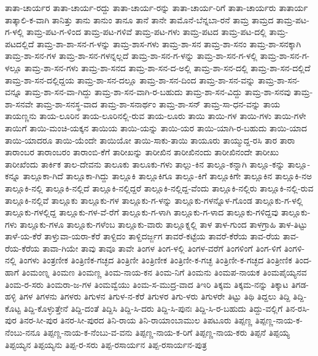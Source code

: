 ತಾತಾ-ಚಾರ್ಯರ
ತಾತಾ-ಚಾರ್ಯ-ರದ್ದು
ತಾತಾ-ಚಾರ್ಯ-ರನ್ನು
ತಾತಾ-ಚಾರ್ಯ-ರಿಗೆ
ತಾತಾ-ಚಾರ್ಯರು
ತಾತಾರ್ಯ
ತಾತ್ಕಾಲಿ-ಕ-ವಾಗಿ
ತಾನಿತ್ತು
ತಾನು
ತಾನುಂ
ತಾನೂ
ತಾನೆ
ತಾನೇ
ತಾಮೊನೆ-ಬೆನ್ನಬಾ-ರನೆ
ತಾಮ್ರ
ತಾಮ್ರದ
ತಾಮ್ರ-ಪಟ-ಗ-ಳಲ್ಲಿ
ತಾಮ್ರ-ಪಟ-ಗ-ಳಿಂದ
ತಾಮ್ರ-ಪಟ-ಗಳಿವೆ
ತಾಮ್ರ-ಪಟ-ಗಳು
ತಾಮ್ರ-ಪಟದ
ತಾಮ್ರ-ಪಟ-ದಲ್ಲಿ
ತಾಮ್ರ-ಪಟದಲ್ಲಿದೆ
ತಾಮ್ರ-ಶಾ-ಶಾ-ಸನ-ಗ-ಳನ್ನು
ತಾಮ್ರ-ಶಾಸ-ಗಳು
ತಾಮ್ರ-ಶಾ-ಸನ
ತಾಮ್ರ-ಶಾ-ಸನಂ
ತಾಮ್ರ-ಶಾ-ಸನಕ್ಕಾಗಿ
ತಾಮ್ರ-ಶಾ-ಸನ-ಗಳ
ತಾಮ್ರ-ಶಾ-ಸನ-ಗಳನ್ನಲ್ಲದೆ
ತಾಮ್ರ-ಶಾ-ಸನ-ಗ-ಳನ್ನು
ತಾಮ್ರ-ಶಾ-ಸನ-ಗ-ಳಲ್ಲಿ
ತಾಮ್ರ-ಶಾ-ಸನ-ಗ-ಳಲ್ಲೂ
ತಾಮ್ರ-ಶಾ-ಸನ-ಗಳು
ತಾಮ್ರ-ಶಾ-ಸನದ
ತಾಮ್ರ-ಶಾ-ಸನ-ದ-ಅಲ್ಲಿ
ತಾಮ್ರ-ಶಾ-ಸನ-ದಲ್ಲಿ
ತಾಮ್ರ-ಶಾ-ಸನ-ದಲ್ಲಿದೆ
ತಾಮ್ರ-ಶಾ-ಸನ-ದಲ್ಲಿದ್ದಯ
ತಾಮ್ರ-ಶಾ-ಸನ-ದಲ್ಲೂ
ತಾಮ್ರ-ಶಾ-ಸನ-ದಿಂದ
ತಾಮ್ರ-ಶಾ-ಸನ-ವನ್ನು
ತಾಮ್ರ-ಶಾ-ಸನ-ವನ್ನೂ
ತಾಮ್ರ-ಶಾ-ಸನ-ವಾ-ಗಿದ್ದು
ತಾಮ್ರ-ಶಾ-ಸನ-ವಾಗಿ-ರ-ಬಹುದು
ತಾಮ್ರ-ಶಾ-ಸನ-ವಿದ್ದು
ತಾಮ್ರ-ಶಾ-ಸನವು
ತಾಮ್ರ-ಶಾ-ಸನವೇ
ತಾಮ್ರ-ಶಾ-ಸನಸ್ಥ-ವಾದ
ತಾಮ್ರ-ಶಾ-ಸನಾರ್ಥಂ
ತಾಮ್ರ-ಶಾ-ಸನ್
ತಾಮ್ರ-ಸಾ-ಧನ-ವನ್ನು
ತಾಯ
ತಾಯಣ್ಣನು
ತಾಯ-ಲೂರಿನ
ತಾಯ-ಲೂರಿನಲ್ಲಿ-ರುವ
ತಾಯ-ಲೂರು
ತಾಯಿ
ತಾಯಿ-ಗಳ
ತಾಯಿ-ಗಳು
ತಾಯಿ-ಗಳೇ
ತಾಯಿಗೆ
ತಾಯಿ-ಮಂಚಿ-ಯಕ್ಕನ
ತಾಯಿಯ
ತಾಯಿ-ಯನ್ನು
ತಾಯಿ-ಯರ
ತಾಯಿ-ಯಾಗಿ-ರ-ಬಹುದು
ತಾಯಿ-ಯಾದ
ತಾಯಿ-ಯಾದರೂ
ತಾಯಿ-ಯೆಂದೇ
ತಾಯಿಯೋ
ತಾಯಿ-ಸಾಕು-ತಾಯಿ
ತಾಯೂರು
ತಾಯ್ಮುದ್ದ-ರಸಿ
ತಾರ
ತಾರಾ
ತಾರಾಂಬರ
ತಾರಾಂಬರಂ
ತಾರಾಂಬಿ-ಕೆಗೆ
ತಾರೀಖನ್ನು
ತಾರೀಖಿನ
ತಾರೀಖಿನಂದು
ತಾರೀಖಿನಂದೇ
ತಾರೀಖು
ತಾರೀಖೆಂದು
ತಾರ್ಕಿಕ
ತಾಲ-ದೇವನು
ತಾಲೂಕು
ತಾಲೂಕು-ಗಳು
ತಾಲ್ಲು-ಕಿನ
ತಾಲ್ಲೂ-ಕನ್ನಾಗಿ
ತಾಲ್ಲೂ-ಕನ್ನು
ತಾಲ್ಲೂ-ಕನ್ನೂ
ತಾಲ್ಲೂಕಾ-ಗಿದೆ
ತಾಲ್ಲೂಕಾ-ಗಿದ್ದು
ತಾಲ್ಲೂಕಿ
ತಾಲ್ಲೂಕಿಗೂ
ತಾಲ್ಲೂ-ಕಿಗೆ
ತಾಲ್ಲೂಕಿಗೇ
ತಾಲ್ಲೂಕಿನ
ತಾಲ್ಲೂಕಿ-ನಅ
ತಾಲ್ಲೂಕಿ-ನಲ್ಲಿ
ತಾಲ್ಲೂಕಿ-ನಲ್ಲಿದೆ
ತಾಲ್ಲೂಕಿ-ನಲ್ಲಿದ್ದರೆ
ತಾಲ್ಲೂಕಿ-ನಲ್ಲಿದ್ದ-ವೆಂದು
ತಾಲ್ಲೂಕಿ-ನಲ್ಲಿರು
ತಾಲ್ಲೂಕಿ-ನಲ್ಲಿ-ರುವ
ತಾಲ್ಲೂಕಿ-ನಲ್ಲಿವೆ
ತಾಲ್ಲೂಕು
ತಾಲ್ಲೂಕು-ಗಳ
ತಾಲ್ಲೂಕು-ಗ-ಳನ್ನು
ತಾಲ್ಲೂಕು-ಗಳನ್ನೊಳ-ಗೊಂಡ
ತಾಲ್ಲೂಕು-ಗ-ಳಲ್ಲಿ
ತಾಲ್ಲೂಕು-ಗಳಲ್ಲಿದ್ದ
ತಾಲ್ಲೂಕು-ಗಳ-ವೆ-ರೆಗೆ
ತಾಲ್ಲೂಕು-ಗ-ಳಾಗಿ
ತಾಲ್ಲೂಕು-ಗ-ಳಾದ
ತಾಲ್ಲೂಕು-ಗಳಿದ್ದವು
ತಾಲ್ಲೂಕು-ಗಳು
ತಾಲ್ಲೂಕು-ಗಳೂ
ತಾಲ್ಲೂಕು-ಗಳೆಂಬ
ತಾಲ್ಲೂಕು-ವಾರು
ತಾಲ್ಲೂಕ್ನಲ್ಲಿ
ತಾಳ
ತಾಳ-ಗುಂದ
ತಾಳಗ್ರಾಹಿ
ತಾಳ-ತಿಟ್ಟು
ತಾಳೆ-ಯ-ಕೆರೆ
ತಾಳ್ತುವಾ-ಯರಾ-ಕೆರೆ
ತಾಳ್ದಿದಂ
ತಾಳ್ದಿದರ್ಜ್ಜಗ
ತಾವರೆ-ಕಟ್ಟೆಯ
ತಾವರೆ-ಕೆರೆಯ
ತಾವ-ರೆಯ
ತಾವ-ರೆಯ-ಕೆರೆಯ
ತಾವಾ-ಗಿಯೇ
ತಾವು
ತಾವೂ
ತಾವೇ
ತಿಂಗಳ
ತಿಂಗ-ಳಲ್ಲಿ
ತಿಂಗಳ-ವರೆಗೆ
ತಿಂಗಳಿಂಗೆ
ತಿಂಗ-ಳಿಗೆ
ತಿಂಗಳಿ-ನಲ್ಲಿ
ತಿಂಗಳು
ತಿಂತ್ರಣೀಕ
ತಿಂತ್ರಿಣಿಕ-ಗಚ್ಛದ
ತಿಂತ್ರಿಣೀ
ತಿಂತ್ರಿಣೀಕ
ತಿಂತ್ರಿಣೀ-ಕ-ಗಚ್ಛ
ತಿಂತ್ರಿಣೀ-ಕ-ಗಚ್ಛದ
ತಿಂತ್ರೀಣಿಕ
ತಿಂದ-ಹಾಗೆ
ತಿಂಮಂಣ್ನ
ತಿಂಮಣ
ತಿಂಮಣ್ಣ
ತಿಂಮ-ನಾಯ-ಕನ
ತಿಂಮ-ನಿಗೆ
ತಿಂಮನು
ತಿಂಮಪ-ನಾಯಕ
ತಿಂಮಪೈಯ್ಯನವ
ತಿಂಮ-ರ-ಸರು
ತಿಂಮರಾ-ಜ-ಗಳ
ತಿಂಮವ್ವೆಯು
ತಿಂಮ-ಸ-ಮುದ್ರ-ವಾದ
ತಿಇರಿ
ತಿಕ್ಕಮ
ತಿಕ್ಕಮ-ನನ್ನು
ತಿಕ್ಕಾಟ
ತಿಗಡ-ಹಳ್ಳಿ
ತಿಗಳ
ತಿಗಳನು
ತಿಗಳರು
ತಿಗುಳನ
ತಿಗುಳ-ನ-ಕೆರೆ
ತಿಗುಳರ
ತಿಗು-ಳರು
ತಿಗುಳರೇ
ತಿಟ್ಟು
ತಿಥಿ
ತಿದ್ದಲು
ತಿದ್ದಿ
ತಿದ್ದಿ-ಕೊಟ್ಟ
ತಿದ್ದಿ-ಕೊಳ್ಳುತ್ತೇನೆ
ತಿದ್ದಿ-ದಂತೆ
ತಿದ್ದಿಸಿ
ತಿದ್ದಿ-ಸಿ-ದರು
ತಿದ್ದಿ-ಸಿ-ಪುನಃ
ತಿದ್ದಿ-ಸಿ-ರ-ಬಹುದು
ತಿದ್ದು-ವಲ್ಲಿಗೆ
ತಿನ-ರಸಿ-ಪುರ
ತಿನರ-ಸೀ-ಪುರ
ತಿನರ-ಸೀ-ಪುರದ
ತಿನಿ-ರಾಯ
ತಿನಿ-ರಾಯಾಂಬಾಮುಲ
ತಿಪಟೂರು
ತಿಪ್ಪಣ್ಣ
ತಿಪ್ಪಣ್ಣ-ನಾಯ-ಕ-ನೆಂಬು-ನನೂ
ತಿಪ್ಪಣ್ಣ-ನಾಯ-ಕ-ನೆಂಬು-ವ-ವನು
ತಿಪ್ಪಣ್ಣ-ನಾಯ-ಕ-ರಿಗೆ
ತಿಪ್ಪಣ್ಣ-ನಾಯ-ಕರು
ತಿಪ್ಪನೆ
ತಿಪ್ಪಯ್ಯ
ತಿಪ್ಪಯ್ಯನ
ತಿಪ್ಪಯ್ಯನು
ತಿಪ್ಪ-ರ-ಸರು
ತಿಪ್ಪ-ರಸಾರ್ಯನ
ತಿಪ್ಪ-ರಸಾರ್ಯನ-ಪುತ್ರ
